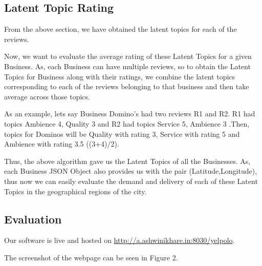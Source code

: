 \documentclass[12pt]{article} %
\begin{document}
\subsection{Latent Topic Rating}

From the above section, we have obtained the latent topics for each of the reviews.

Now, we want to evaluate the average rating of these Latent Topics for a given Business. As, each Business can have multiple reviews, so to obtain the Latent Topics for Business along with their ratings, we combine the latent topics corresponding to each of the reviews belonging to that business and then take average across those topics. 

As an example, lets say Business Domino's had two reviews R1 and R2. R1 had topics Ambience 4, Quality 3 and R2 had topics Service 5, Ambience 3 .Then, topics for Dominos will be Quality with rating 3, Service with rating 5 and Ambience with rating 3.5 ((3+4)/2). 
 
Thus, the above algorithm gave us the Latent Topics of all the Businesses. As, each Business JSON Object also provides us with the pair (Latitude,Longitude), thus now we can easily evaluate the demand and delivery of each of these Latent Topics in the geographical regions of the city.
 
%
%


\subsection{Evaluation}

Our software is live and hosted on \href{http://a.ashwinikhare.in:8030/yelpolo}{http://a.ashwinikhare.in:8030/yelpolo}. 

The screenshot of the webpage can be seen in Figure 2.
\end{document}
